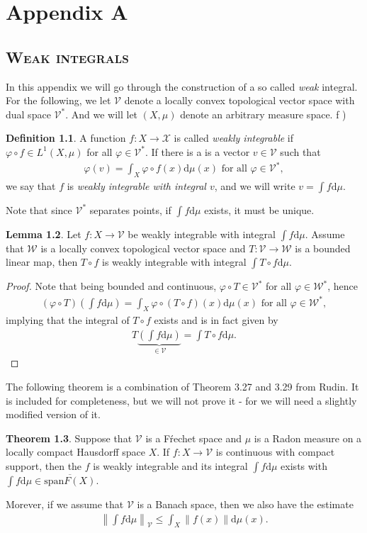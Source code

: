 \documentclass[10pt,twoside,openany,final]{memoir}
\newcommand{\sssection}[1]{%
\section[#1]{\centering\normalfont\scshape \textbf{#1}}}
\theoremstyle{definition}
\newtheorem{theorem}{Theorem}[chapter]
\newtheorem{lemma}[theorem]{Lemma}
\newtheorem{definition}[theorem]{Definition}
\theoremstyle{Break}
\newcommand{\lv}{\left\lVert}
\newcommand{\rv}{\right\rVert}
\renewcommand{\d}{\mathrm{d}}
\begin{document}
\chapter{Appendix A}
\sssection{Weak integrals}
In this appendix we will go through the construction of a so called \textit{weak} integral. For the following, we let $\mathcal{V}$ denote a locally convex topological vector space with dual space $\mathcal{V}^*$. And we will let $(X,\mu)$ denote an arbitrary measure space.
f
)\begin{definition}
	A function $f \colon X \to \mathcal{X}$ is called \emph{weakly integrable} if $\varphi \circ f \in L^1(X,\mu)$ for all $ \varphi \in \mathcal{V}^*$. If there is a is a vector $v \in \mathcal{V}$ such that
	\begin{align*}
		\varphi(v) = \int_X  \varphi \circ f(x) \d \mu(x) \text{ for all } \varphi \in \mathcal{V}^*,	
	\end{align*}
	we say that $f$ is \emph{weakly integrable with integral $v$}, and we will write $v=\int f \d \mu$.
\end{definition}
Note that since $\mathcal{V}^*$ separates points, if $\int f \d \mu$ exists, it must be unique.
\begin{lemma}
	Let $f \colon X \to \mathcal{V}$ be weakly integrable with integral $\int f \d \mu$. Assume that $\mathcal{W}$ is a locally convex topological vector space and $T \colon  \mathcal{V} \to \mathcal{W}$ is a bounded linear map, then $T \circ f$ is weakly integrable with integral $\int T \circ f \d \mu$.
	\label{intcom}
\end{lemma}
\begin{proof}
	Note that being bounded and continuous, $\varphi \circ T \in \mathcal{V}^*$ for all $\varphi \in \mathcal{W}^*$, hence
	\begin{align*}
		(\varphi \circ T) \left( \int f \d \mu \right) = \int_X \varphi \circ (T \circ f)(x) \d \mu(x) \text{ for all } \varphi \in \mathcal{W}^*,
	\end{align*}
implying that the integral of $T \circ f$ exists and is in fact given by
\begin{align*}
	T\underbrace{\left( \int f \d \mu \right)}_{\in \mathcal{V}}= \int T \circ f \d \mu.
\end{align*}
\end{proof}
The following theorem is a combination of Theorem 3.27 and 3.29 from Rudin. It is included for completeness, but we will not prove it - for we will need a slightly modified version of it.
\begin{theorem}
	Suppose that $\mathcal{V}$ is a Fŕechet space and $\mu$ is a Radon measure on a locally compact Hausdorff space $X$. If $f \colon X \to \mathcal{V}$ is continuous with compact support, then the $f$ is weakly integrable and its integral $\int f \d \mu$ exists with $\int f \d \mu \in \overline{\mathrm{span}F(X)}$. 

\indent	Morever, if we assume that $\mathcal{V}$ is a Banach space, then we also have the estimate
	\begin{align}
		\lv \int f \d \mu \rv_\mathcal{V} \leq \int_X \lv f(x) \rv \d \mu(x).
		\label{A3.2}
	\end{align}
	\label{A3.1}
\end{theorem}
\end{document}

